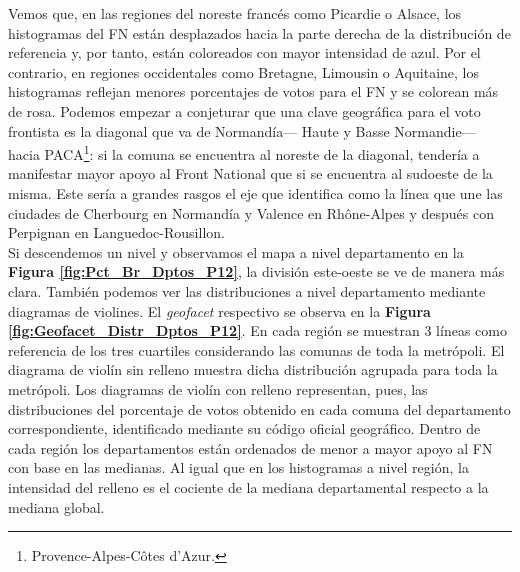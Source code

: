 Vemos que, en las regiones del noreste francés como Picardie o Alsace, los histogramas del FN están desplazados hacia la parte derecha de la distribución de referencia y, por tanto, están coloreados con mayor intensidad de azul. Por el contrario, en regiones occidentales como Bretagne, Limousin o Aquitaine, los histogramas reflejan menores porcentajes de votos para el FN y se colorean más de rosa. Podemos empezar a conjeturar que una clave geográfica para el voto frontista es la diagonal que va de Normandía--- Haute y Basse Normandie--- hacia PACA\footnote{Provence-Alpes-Côtes d'Azur.}: si la comuna se encuentra al noreste de la diagonal, tendería a manifestar mayor apoyo al Front National que si se encuentra al sudoeste de la misma. Este sería a grandes rasgos el eje que \textcite{Goodliffe16} identifica como la línea que une las ciudades de Cherbourg en Normandía y Valence en Rhône-Alpes y después con Perpignan en Languedoc-Rousillon.\\ 

Si descendemos un nivel y observamos el mapa a nivel departamento en la \textbf{Figura \ref{fig:Pct_Br_Dptos_P12}}, la división este-oeste se ve de manera más clara. También podemos ver las distribuciones a nivel departamento mediante diagramas de violines. El \textit{geofacet} respectivo se observa en la \textbf{Figura \ref{fig:Geofacet_Distr_Dptos_P12}}. En cada región se muestran 3 líneas como referencia de los tres cuartiles considerando las comunas de toda la metrópoli. El diagrama de violín sin relleno muestra dicha distribución agrupada para toda la metrópoli. Los diagramas de violín con relleno representan, pues, las distribuciones del porcentaje de votos obtenido en cada comuna del departamento correspondiente, identificado mediante su código oficial geográfico. Dentro de cada región los departamentos están ordenados de menor a mayor apoyo al FN con base en las medianas. Al igual que en los histogramas a nivel región, la intensidad del relleno es el cociente de la mediana departamental respecto a la mediana global.\\ 


